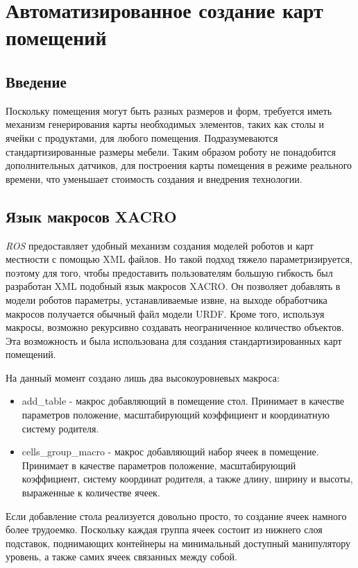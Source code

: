 \chapter{Автоматизированное создание карт помещений} \label{ch:6}

\section{Введение}\label{sect:6_1}
Поскольку помещения могут быть разных размеров и форм, требуется иметь механизм генерирования карты необходимых элементов, таких как столы и ячейки с продуктами, для любого помещения. Подразумеваются стандартизированные размеры мебели. Таким образом роботу не понадобится дополнительных датчиков, для построения карты помещения в режиме реального времени, что уменьшает стоимость создания и внедрения технологии.

\section{Язык макросов XACRO}\label{sect:6_2}
\textit{ROS} предоставляет удобный механизм создания моделей роботов и карт местности с помощью XML файлов. Но такой подход тяжело параметризируется, поэтому для того, чтобы предоставить пользователям большую гибкость был разработан XML подобный язык макросов XACRO. Он позволяет добавлять в модели роботов параметры, устанавливаемые извне, на выходе обработчика макросов получается обычный файл модели URDF. Кроме того, используя макросы, возможно рекурсивно создавать неограниченное количество объектов. Эта возможность и была использована для создания стандартизированных карт помещений. 

На данный момент создано лишь два высокоуровневых макроса:
\begin{itemize}
	\item add\_table - макрос добавляющий в помещение стол. Принимает в качестве параметров положение, масштабирующий коэффициент и координатную систему родителя.
	\item cells\_group\_macro - макрос добавляющий набор ячеек в помещение. Принимает в качестве параметров положение, масштабирующий коэффициент, систему координат родителя, а также длину, ширину и высоты, выраженные к количестве ячеек.
\end{itemize}

Если добавление стола реализуется довольно просто, то создание ячеек намного более трудоемко. Поскольку каждая группа ячеек состоит из нижнего слоя подставок, поднимающих контейнеры на минимальный доступный манипулятору уровень, а также самих ячеек связанных между собой.


